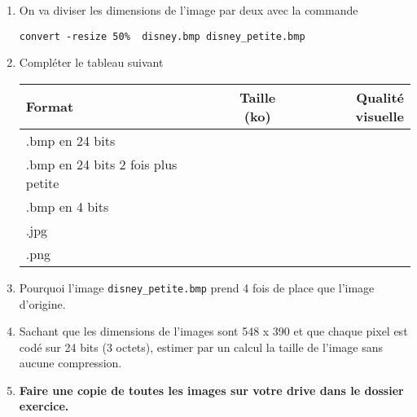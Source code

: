 \documentclass[a4paper,12pt, twoside]{article}
\begin{document}
\begin{enumerate}
	\item On va diviser les dimensions de l'image par deux avec la commande
	\begin{lstlisting}[numbers=none]
		convert -resize 50%  disney.bmp disney_petite.bmp
	\end{lstlisting}
	\item Compléter le tableau suivant
	\begin{center}
		\begin{tabular}{| l || c | r | }
			\hline
			Format & Taille (ko) & Qualité visuelle \\ \hline
			.bmp en 24 bits &  &  \\ \hline
			.bmp en 24 bits 2 fois plus petite &  &  \\ \hline
			.bmp en 4 bits &  &  \\ \hline
			.jpg &  &  \\ \hline
			.png &  &  \\
			\hline
		\end{tabular}
	\end{center}
	\item Pourquoi l'image \texttt{disney\_petite.bmp} prend 4 fois de place que l'image d'origine.
	\vspace{2cm}
	\item Sachant que les dimensions de l'images sont 548 x 390 et que chaque pixel est codé sur 24 bits (3 octets), estimer par un calcul la taille de l'image sans aucune compression.
	\vspace{2cm}
	\item \textbf{Faire une copie de toutes les images sur votre drive dans le dossier exercice.}
\end{enumerate}
\end{document}

